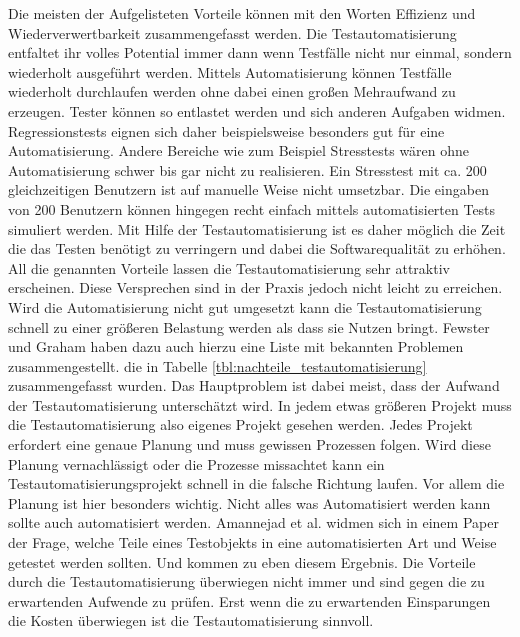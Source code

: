 Die meisten der Aufgelisteten Vorteile können mit den Worten Effizienz und Wiederverwertbarkeit zusammengefasst werden.
Die Testautomatisierung entfaltet ihr volles Potential immer dann wenn Testfälle nicht nur einmal, sondern wiederholt ausgeführt werden. Mittels Automatisierung können Testfälle wiederholt durchlaufen werden ohne dabei einen großen Mehraufwand zu erzeugen. Tester können so entlastet werden und sich anderen Aufgaben widmen. Regressionstests eignen sich daher beispielsweise besonders gut für eine Automatisierung. Andere Bereiche wie zum Beispiel Stresstests wären ohne Automatisierung schwer bis gar nicht zu realisieren. Ein Stresstest mit ca. 200 gleichzeitigen Benutzern ist auf manuelle Weise nicht umsetzbar. Die eingaben von 200 Benutzern können hingegen recht einfach mittels automatisierten Tests simuliert werden.
Mit Hilfe der Testautomatisierung ist es daher möglich die Zeit die das Testen benötigt zu verringern und dabei die Softwarequalität zu erhöhen. \newline
All die genannten Vorteile lassen die Testautomatisierung sehr attraktiv erscheinen. Diese Versprechen sind in der Praxis jedoch nicht leicht zu erreichen. Wird die Automatisierung nicht gut umgesetzt kann die Testautomatisierung schnell zu einer größeren Belastung werden als dass sie Nutzen bringt.
Fewster und Graham haben dazu auch hierzu eine Liste mit bekannten Problemen zusammengestellt. \cite{fewster_software_1999} die in Tabelle \ref{tbl:nachteile_testautomatisierung} zusammengefasst wurden.
Das Hauptproblem ist dabei meist, dass der Aufwand der Testautomatisierung unterschätzt wird. In jedem etwas größeren Projekt muss die Testautomatisierung also eigenes Projekt gesehen werden. Jedes Projekt erfordert eine genaue Planung und muss gewissen Prozessen folgen. Wird diese Planung vernachlässigt oder die Prozesse missachtet kann ein Testautomatisierungsprojekt schnell in die falsche Richtung laufen.
Vor allem die Planung ist hier besonders wichtig. Nicht alles was Automatisiert werden kann sollte auch automatisiert werden.
Amannejad et al. \cite{amannejad_search-based_2014} widmen sich in einem Paper der Frage, welche Teile eines Testobjekts in eine automatisierten Art und Weise getestet werden sollten. Und kommen zu eben diesem Ergebnis. Die Vorteile durch die Testautomatisierung überwiegen nicht immer und sind gegen die zu erwartenden Aufwende zu prüfen. Erst wenn die zu erwartenden Einsparungen die Kosten überwiegen ist die Testautomatisierung sinnvoll.



